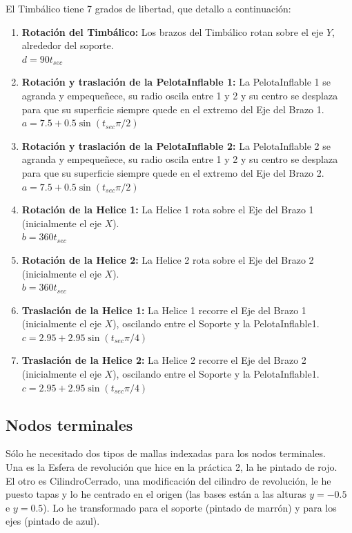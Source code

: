 \documentclass[12pt]{article}
\begin{document}
El Timbálico tiene 7 grados de libertad, que detallo a continuación:
\begin{enumerate}
\item \textbf{Rotación del Timbálico:}
  Los brazos del Timbálico rotan sobre el eje $Y$, alrededor del soporte. \\ $d=90t_{sec}$
\item \textbf{Rotación y traslación de la PelotaInflable 1:}
  La PelotaInflable 1 se agranda y empequeñece, su radio oscila entre 1 y 2 y su centro se desplaza para que su superficie siempre quede en el extremo del Eje del Brazo 1. \\ $a=7.5+0.5\sin(t_{sec}\pi/2)$
\item \textbf{Rotación y traslación de la PelotaInflable 2:}
  La PelotaInflable 2 se agranda y empequeñece, su radio oscila entre 1 y 2 y su centro se desplaza para que su superficie siempre quede en el extremo del Eje del Brazo 2. \\ $a=7.5+0.5\sin(t_{sec}\pi/2)$
\item \textbf{Rotación de la Helice 1:}
  La Helice 1 rota sobre el Eje del Brazo 1 (inicialmente el eje $X$).
  \\ $b=360t_{sec}$
\item \textbf{Rotación de la Helice 2:}
  La Helice 2 rota sobre el Eje del Brazo 2 (inicialmente el eje $X$).
  \\ $b=360t_{sec}$
\item \textbf{Traslación de la Helice 1:} La Helice 1 recorre el Eje
  del Brazo 1 (inicialmente el eje $X$), oscilando entre el Soporte y
  la PelotaInflable1. \\ $c=2.95+2.95\sin(t_{sec}\pi/4)$
\item \textbf{Traslación de la Helice 2:} La Helice 2 recorre el Eje
  del Brazo 2 (inicialmente el eje $X$), oscilando entre el Soporte y
  la PelotaInflable1. \\ $c=2.95+2.95\sin(t_{sec}\pi/4)$
\end{enumerate}

\subsection*{Nodos terminales}

Sólo he necesitado dos tipos de mallas indexadas para los nodos terminales. \\

Una es la Esfera de revolución que hice en la práctica 2, la he pintado de rojo. \\

El otro es CilindroCerrado, una modificación del cilindro de
revolución, le he puesto tapas y lo he centrado en el origen (las
bases están a las alturas $y=-0.5$ e $y=0.5$). Lo he transformado para
el soporte (pintado de marrón) y para los ejes (pintado de azul).
\end{document}
